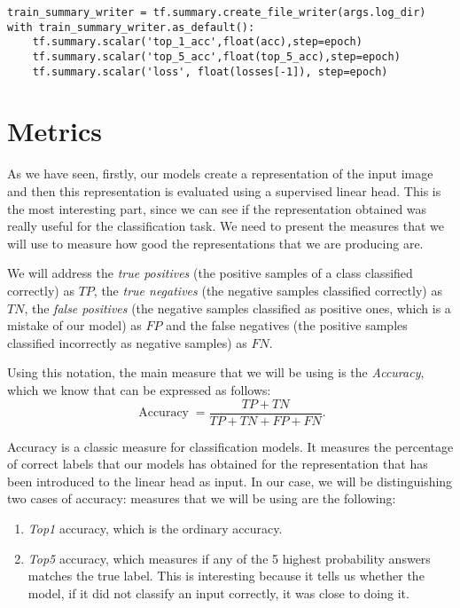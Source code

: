 \begin{verbatim}
train_summary_writer = tf.summary.create_file_writer(args.log_dir)
with train_summary_writer.as_default():
    tf.summary.scalar('top_1_acc',float(acc),step=epoch)
    tf.summary.scalar('top_5_acc',float(top_5_acc),step=epoch)
    tf.summary.scalar('loss', float(losses[-1]), step=epoch)
\end{verbatim}


\section{Metrics}

As we have seen, firstly, our models create a representation of the input image and then this representation is evaluated using a supervised linear head. This is the most interesting part, since we can see if the representation obtained was really useful for the classification task. We need to present the measures that we will use to measure how good the representations that we are producing are.



\begin{notation}
We will address the \emph{true positives} (the positive samples of a class classified correctly) as $TP$, the \emph{true negatives} (the negative samples classified correctly) as $TN$, the \emph{false positives} (the negative samples classified as positive ones, which is a mistake of our model) as $FP$ and the false negatives (the positive samples classified incorrectly as negative samples) as $FN$.
\end{notation}

Using this notation, the main measure that we will be using is the \emph{Accuracy}, which we know that can be expressed as follows:
\[
\operatorname{Accuracy} = \frac{TP + TN}{TP + TN + FP + FN}  .  
\] 

Accuracy is a classic measure for classification models. It measures the percentage of correct labels that our models has obtained for the representation that has been introduced to the linear head as input. In our case, we will be distinguishing two cases of accuracy:
measures that we will be using are the following:

\begin{enumerate}
\item \emph{Top1} accuracy, which is the ordinary accuracy.
\item \emph{Top5} accuracy, which measures if any of the 5 highest probability answers matches the true label. This is interesting because it tells us whether the model, if it did not classify an input correctly, it was close to doing it.
\end{enumerate}




